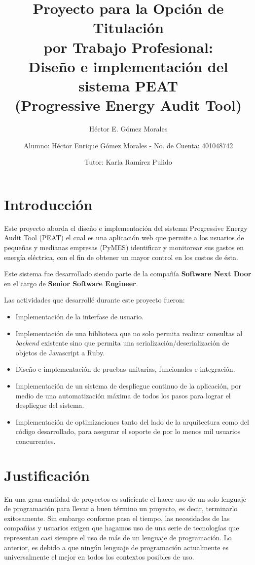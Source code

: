 \documentclass{article}
\author{Héctor E. Gómez Morales}
\title{Proyecto para la Opción de Titulación\\
  por Trabajo Profesional:\\
  Diseño e implementación del sistema PEAT\\
  (Progressive Energy Audit Tool)}
\begin{document}
\author{ Alumno: Héctor Enrique Gómez Morales - No. de Cuenta: 401048742 \and
  Tutor: Karla Ramírez Pulido}
\maketitle
\section{Introducción}
Este proyecto aborda el diseño e implementación del sistema Progressive Energy
Audit Tool (PEAT) el cual es una aplicación web que
permite a los usuarios de pequeñas y medianas empresas (PyMES)
identificar y monitorear sus gastos en energía eléctrica, con el fin de obtener
un mayor control en los costos de ésta.

Este sistema fue desarrollado siendo parte de la compañía
\textbf{Software Next Door} en el cargo de \textbf{Senior Software Engineer}.

Las actividades que desarrollé durante este proyecto fueron:
\begin{itemize}
\item Implementación de la interfase de usuario.
\item Implementación de una biblioteca que no solo permita realizar consultas
  al \textit{backend} existente sino que permita una serialización/deserialización
  de objetos de Javascript a Ruby.
\item Diseño e implementación de pruebas unitarias, funcionales e integración.
\item Implementación de un sistema de despliegue continuo de la aplicación, por
  medio de una automatización máxima de todos los pasos para lograr el despliegue
  del sistema.
\item Implementación de optimizaciones tanto del lado de la arquitectura como
  del código desarrollado, para asegurar el soporte de por lo menos mil usuarios
  concurrentes.
\end{itemize}

\section{Justificación}
En una gran cantidad de proyectos es suficiente
el hacer uso de un solo lenguaje de programación para llevar a buen
término un proyecto, es decir, terminarlo exitosamente.
Sin embargo conforme pasa el tiempo, las necesidades
de las compañías y usuarios exigen que hagamos uso de una serie de
tecnologías que representan casi siempre el uso de más de un lenguaje
de programación. Lo anterior, es debido a que ningún lenguaje de programación
actualmente es universalmente el mejor en todos los contextos posibles de uso.
\end{document}
